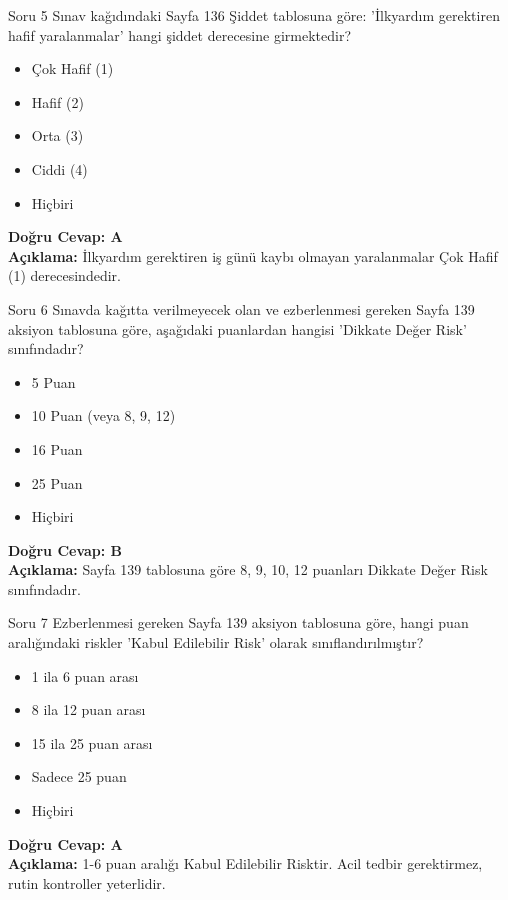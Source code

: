 \documentclass[12pt,a4paper]{article}
\begin{document}
\begin{testcard}{Soru 5}
    Sınav kağıdındaki Sayfa 136 Şiddet tablosuna göre: 'İlkyardım gerektiren hafif yaralanmalar' hangi şiddet derecesine girmektedir?
    \begin{itemize}
        \item[A)] Çok Hafif (1)
        \item[B)] Hafif (2)
        \item[C)] Orta (3)
        \item[D)] Ciddi (4)
        \item[E)] Hiçbiri
    \end{itemize}
    \tcblower
    \textbf{Doğru Cevap: A} \\
    \textbf{Açıklama:} İlkyardım gerektiren iş günü kaybı olmayan yaralanmalar Çok Hafif (1) derecesindedir.
\end{testcard}

\begin{testcard}{Soru 6}
    Sınavda kağıtta verilmeyecek olan ve ezberlenmesi gereken Sayfa 139 aksiyon tablosuna göre, aşağıdaki puanlardan hangisi 'Dikkate Değer Risk' sınıfındadır?
    \begin{itemize}
        \item[A)] 5 Puan
        \item[B)] 10 Puan (veya 8, 9, 12)
        \item[C)] 16 Puan
        \item[D)] 25 Puan
        \item[E)] Hiçbiri
    \end{itemize}
    \tcblower
    \textbf{Doğru Cevap: B} \\
    \textbf{Açıklama:} Sayfa 139 tablosuna göre 8, 9, 10, 12 puanları Dikkate Değer Risk sınıfındadır.
\end{testcard}

\begin{testcard}{Soru 7}
    Ezberlenmesi gereken Sayfa 139 aksiyon tablosuna göre, hangi puan aralığındaki riskler 'Kabul Edilebilir Risk' olarak sınıflandırılmıştır?
    \begin{itemize}
        \item[A)] 1 ila 6 puan arası
        \item[B)] 8 ila 12 puan arası
        \item[C)] 15 ila 25 puan arası
        \item[D)] Sadece 25 puan
        \item[E)] Hiçbiri
    \end{itemize}
    \tcblower
    \textbf{Doğru Cevap: A} \\
    \textbf{Açıklama:} 1-6 puan aralığı Kabul Edilebilir Risktir. Acil tedbir gerektirmez, rutin kontroller yeterlidir.
\end{testcard}
\end{document}

